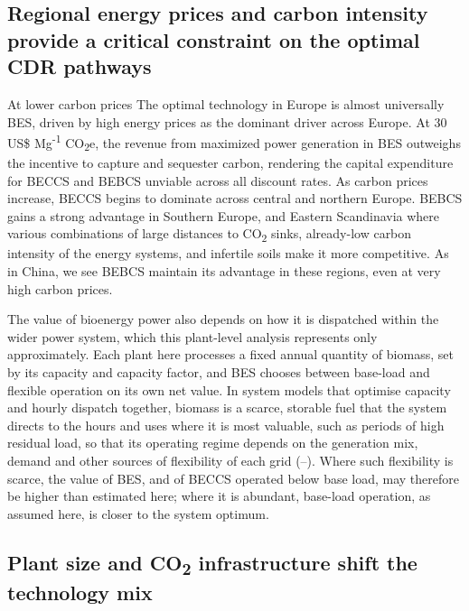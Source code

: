 \documentclass[
  letterpaper,
]{article}
\begin{document}
\subsection{Regional energy prices and carbon intensity provide a
critical constraint on the optimal CDR
pathways}\label{regional-energy-prices-and-carbon-intensity-provide-a-critical-constraint-on-the-optimal-cdr-pathways}

At lower carbon prices The optimal technology in Europe is almost
universally BES, driven by high energy prices as the dominant driver
across Europe. At 30 US\$ Mg\textsuperscript{-1} CO\textsubscript{2}e,
the revenue from maximized power generation in BES outweighs the
incentive to capture and sequester carbon, rendering the capital
expenditure for BECCS and BEBCS unviable across all discount rates. As
carbon prices increase, BECCS begins to dominate across central and
northern Europe. BEBCS gains a strong advantage in Southern Europe, and
Eastern Scandinavia where various combinations of large distances to
CO\textsubscript{2} sinks, already-low carbon intensity of the energy
systems, and infertile soils make it more competitive. As in China, we
see BEBCS maintain its advantage in these regions, even at very high
carbon prices.

The value of bioenergy power also depends on how it is dispatched within
the wider power system, which this plant-level analysis represents only
approximately. Each plant here processes a fixed annual quantity of
biomass, set by its capacity and capacity factor, and BES chooses
between base-load and flexible operation on its own net value. In system
models that optimise capacity and hourly dispatch together, biomass is a
scarce, storable fuel that the system directs to the hours and uses
where it is most valuable, such as periods of high residual load, so
that its operating regime depends on the generation mix, demand and
other sources of flexibility of each grid
(--).
Where such flexibility is scarce, the value of BES, and of BECCS
operated below base load, may therefore be higher than estimated here;
where it is abundant, base-load operation, as assumed here, is closer to
the system optimum.

\subsection{\texorpdfstring{Plant size and CO\textsubscript{2}
infrastructure shift the technology
mix}{Plant size and CO2 infrastructure shift the technology mix}}\label{plant-size-and-co2-infrastructure-shift-the-technology-mix}
\end{document}
